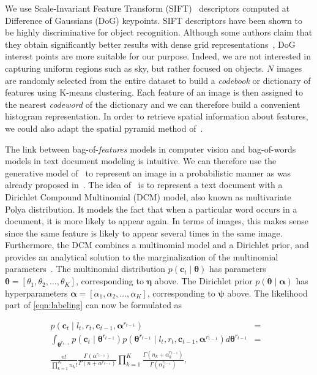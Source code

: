 We use Scale-Invariant Feature Transform (SIFT)~\cite{lowe04distinctive}
descriptors computed at Difference of Gaussians (DoG) keypoints. SIFT
descriptors have been shown to be highly discriminative for object recognition.
Although some authors claim that they obtain significantly better results with
dense grid representations~\cite{feifei05bayesian}, DoG interest points are more
suitable for our purpose. Indeed, we are not interested in capturing uniform
regions such as sky, but rather focused on objects. $N$ images are randomly
selected from the entire dataset to build a \emph{codebook} or dictionary of
features using K-means clustering. Each feature of an image is then assigned to
the nearest \emph{codeword} of the dictionary and we can therefore build a
convenient histogram representation. In order to retrieve spatial information
about features, we could also adapt the spatial pyramid method
of~\cite{lazebnik06beyond}.

The link between bag-of-\emph{features} models in computer vision and
bag-of-words models in text document modeling is intuitive. We can therefore use
the generative model of~\cite{madsen05modeling} to represent an image in a
probabilistic manner as was already proposed in~\cite{ranganathan09bayesian}.
The idea of~\cite{madsen05modeling} is to represent a text document with a
Dirichlet Compound Multinomial (DCM) model, also known as multivariate Polya
distribution. It models the fact that when a particular word occurs in a
document, it is more likely to appear again. In terms of images, this makes
sense since the same feature is likely to appear several times in the same
image. Furthermore, the DCM combines a multinomial model and a Dirichlet prior,
and provides an analytical solution to the marginalization of the multinomial
parameters~\cite{minka03estimating}. The multinomial distribution
$p(\mathbf{c}_t\mid\boldsymbol{\theta})$ has parameters $\boldsymbol{\theta}=
[\theta_1,\theta_2,\dots,\theta_K]$, corresponding to $\boldsymbol{\eta}$ above.
The Dirichlet prior $p(\boldsymbol{\theta}\mid\boldsymbol{\alpha})$ has
hyperparameters $\boldsymbol{\alpha}=[\alpha_1,\alpha_2,\dots,\alpha_K]$,
corresponding to $\boldsymbol{\psi}$ above. The likelihood part of
\eqref{eqn:labeling} can now be formulated as

\begin{eqnarray}
\label{eqn:polya}
p(\mathbf{c}_t\mid l_t,r_t,\mathbf{c}_{t-1},\boldsymbol{\alpha}^{r_{t-1}})
&=&\\\nonumber
\int_{\boldsymbol{\theta}^{r_{t-1}}}
p(\mathbf{c}_{t}\mid\boldsymbol{\theta}^{r_{t-1}})
p(\boldsymbol{\theta}^{r_{t-1}}\mid
l_t,r_t,\mathbf{c}_{t-1},\boldsymbol{\alpha}^{r_{t-1}})
d\boldsymbol{\theta}^{r_{t-1}}
&=&\\\nonumber\frac{n!}{\prod_{k=1}^K n_k!}\frac{\Gamma(\alpha^{r_{t-1}})}
{\Gamma(n+\alpha^{r_{t-1}})}\prod_{k=1}^K\frac{\Gamma(n_k+\alpha^{r_{t-1}}_k)}
{\Gamma(\alpha^{r_{t-1}}_k)},
\end{eqnarray}

